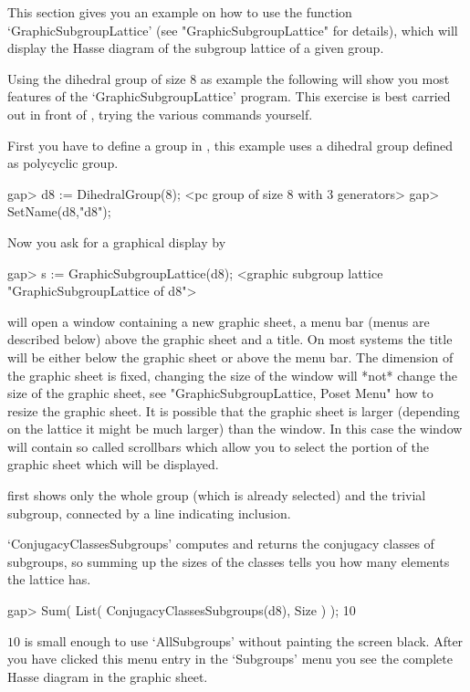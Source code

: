 
This  section   gives  you an   example    on how  to    use the function
`GraphicSubgroupLattice' (see "GraphicSubgroupLattice" for  details), which 
will  display the Hasse diagram of the subgroup lattice of a given group.

Using the dihedral group of size $8$ as example the following will show you
most features of the `GraphicSubgroupLattice' program.  This exercise is
best carried out in front of {\XGAP}, trying the various commands yourself.

First  you   have to define a  group   in {\GAP},  this example  uses a
dihedral group defined as polycyclic group.

\begintt
gap> d8 := DihedralGroup(8);
<pc group of size 8 with 3 generators>
gap> SetName(d8,"d8");
\endtt

Now you ask for a graphical display by

\begintt
gap> s := GraphicSubgroupLattice(d8);
<graphic subgroup lattice "GraphicSubgroupLattice of d8">
\endtt

{\XGAP} will open a window containing a new graphic sheet, a menu bar
(menus are described below) above the graphic sheet and a title.  On most
systems the title will be either below the graphic sheet or above the menu
bar.  The dimension of the graphic sheet is fixed, changing the size of the
window will *not* change the size of the graphic sheet, see
"GraphicSubgroupLattice, Poset Menu" how to resize the graphic sheet.  It
is possible that the graphic sheet is larger (depending on the lattice it
might be much larger) than the window.  In this case the window will
contain so called scrollbars which allow you to select the portion of the
graphic sheet which will be displayed. 

{\XGAP} first shows only the whole group (which is already selected) and
the trivial subgroup, connected by a line indicating inclusion. 

`ConjugacyClassesSubgroups' computes and returns the conjugacy classes of
subgroups, so summing  up the sizes  of the classes   tells you how  many
elements the lattice has.

\begintt
    gap> Sum( List( ConjugacyClassesSubgroups(d8), Size ) );
    10 
\endtt

$10$ is small enough to use `AllSubgroups' without painting the screen
black.  After you have clicked this menu entry in the `Subgroups' menu you
see the complete Hasse diagram in the graphic sheet.

